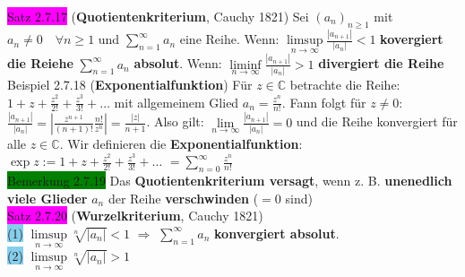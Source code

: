 \documentclass[landscape, 10pt]{article}
\newcommand{\C}{\mathbb{C}}
\begin{document}
\begin{multicols}{3}
              \colorbox{magenta}{Satz 2.7.17} 
              (\textbf{Quotientenkriterium}, Cauchy 1821) 
                     Sei \textcolor{NavyBlue}{$(a_n)_{n\geqslant1}$} mit 
                     \textcolor{NavyBlue}{$a_n\neq0\quad\forall n\geqslant1$}
                     und \textcolor{NavyBlue}{$\sum_{n=1}^\infty a_n$} eine Reihe.
                     Wenn: 
                     \textcolor{NavyBlue}{$\limsup\limits_{n\to\infty}\frac{|a_{n+1}|}{|a_n|}<1$}
                     \textbf{kovergiert die Reiehe} 
                     \textcolor{NavyBlue}{$\sum_{n=1}^\infty a_n$} \textbf{absolut}.
                     Wenn: 
                     \textcolor{NavyBlue}{$\liminf\limits_{n\to\infty}\frac{|a_{n+1}|}{|a_n|}>1$}
                     \textbf{divergiert die Reihe}\\
              \colorbox{Dandelion}{Beispiel 2.7.18} (\textbf{Exponentialfunktion})
                     Für $z\in\C$ betrachte die Reihe:
                     $1+z+\frac{z^2}{2!}+\frac{z^3}{3!}+\dots$
                     mit allgemeinem Glied 
                     $a_n=\frac{z^n}{n!}$.
                     Fann folgt für $z\neq0$:
                     $\frac{|a_{n+1}|}{|a_n|}
                     =|\frac{z^{n+1}}{(n+1)!}\frac{n!}{z^n}|
                     =\frac{|z|}{n+1}$. Also gilt:
                     $\lim\limits_{n\to\infty}\frac{|a_{n+1}|}{|a_n|}=0$
                     und die Reihe konvergiert 
                     für alle $z\in\C$.
                     Wir definieren die \textbf{Exponentialfunktion}: 
                     $\exp z:=1+z+\frac{z^2}{2!}+\frac{z^3}{3!}+\dots$
                     $=\sum_{n=0}^\infty\frac{z^n}{n!}$\\
              \colorbox{green}{Bemerkung 2.7.19} 
                     Das \textbf{Quotientenkriterium versagt}, wenn z. B. 
                     \textbf{unenedlich viele Glieder} $a_n$ der Reihe 
                     \textbf{verschwinden} ($=0$ sind)\\
              \colorbox{magenta}{Satz 2.7.20}
              (\textbf{Wurzelkriterium}, Cauchy 1821)\\
                     \colorbox{SkyBlue}{(1)} 
                            \textcolor{NavyBlue}{
                            $\limsup\limits_{n\to\infty}\sqrt[n]{|a_n|}<1$}
                            $\Longrightarrow$
                            \textcolor{NavyBlue}{$\sum_{n=1}^\infty a_n$} 
                            \textbf{konvergiert absolut}.\\
                     \colorbox{SkyBlue}{(2)} 
                            \textcolor{NavyBlue}{$\limsup\limits_{n\to\infty}\sqrt[n]{|a_n|}>1$}

\end{multicols}
\end{document}
